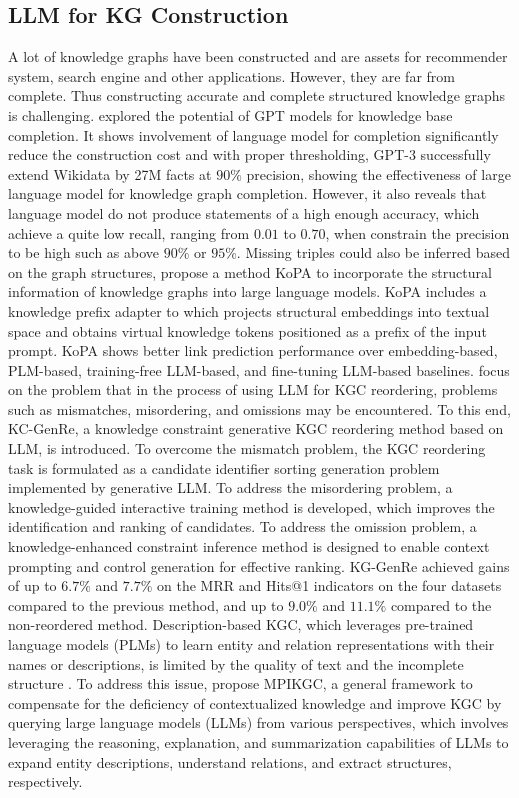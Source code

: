 \subsection{LLM for KG Construction}
A lot of knowledge graphs have been constructed and are assets for recommender system, search engine and other applications. However, they are far from complete. Thus 
constructing accurate and complete structured knowledge graphs is challenging.
\cite{llm4kbc} explored the potential of GPT models for knowledge base completion. It shows involvement of language model for completion significantly reduce the construction cost and with proper thresholding, GPT-3 successfully extend Wikidata by 27M facts at $90\%$ precision, showing the effectiveness of large language model for knowledge graph completion. However, it also reveals that language model do not produce statements of a high enough accuracy, which achieve a quite low recall, ranging from $0.01$ to $0.70$, when constrain the precision to be high such as above $90\%$ or $95\%$. 
Missing triples could also be inferred based on the graph structures, 
\cite{kopa} propose a method KoPA to incorporate the structural information of knowledge graphs into large language models. KoPA includes a knowledge prefix adapter to which projects structural embeddings into textual space and obtains virtual knowledge tokens positioned as a prefix of the input prompt. KoPA shows better link prediction performance over embedding-based, PLM-based, training-free LLM-based, and fine-tuning LLM-based baselines. 
\cite{DBLP:conf/coling/WangHHLYL24} focus on the problem that in the process of using LLM for KGC reordering, problems such as mismatches, misordering, and omissions may be encountered. To this end, KC-GenRe, a knowledge constraint generative KGC reordering method based on LLM, is introduced. To overcome the mismatch problem, the KGC reordering task is formulated as a candidate identifier sorting generation problem implemented by generative LLM. To address the misordering problem, a knowledge-guided interactive training method is developed, which improves the identification and ranking of candidates. To address the omission problem, a knowledge-enhanced constraint inference method is designed to enable context prompting and control generation for effective ranking. KG-GenRe achieved gains of up to $6.7\%$ and $7.7\%$ on the MRR and Hits@1 indicators on the four datasets compared to the previous method, and up to $9.0\%$ and $11.1\%$ compared to the non-reordered method. 
Description-based KGC, which leverages pre-trained language models (PLMs) to learn entity and relation representations with their names or descriptions, is limited by the quality of text and the incomplete structure \cite{DBLP:conf/coling/XuZLWZ000C24}. To address this issue, \cite{DBLP:conf/coling/XuZLWZ000C24} propose MPIKGC, a general framework to compensate for the deficiency of contextualized knowledge and improve KGC by querying large language models (LLMs) from various perspectives, which involves leveraging the reasoning, explanation, and summarization capabilities of LLMs to expand entity descriptions, understand relations, and extract structures, respectively. 
